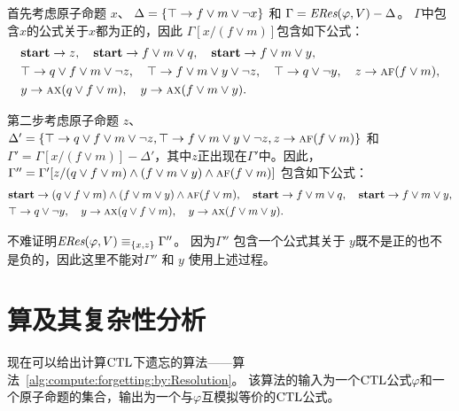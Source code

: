 \begin{example}\label{examp:Aclm}
	首先考虑原子命题 $x$、 $\Delta=\{\top \rightarrow f \vee m \vee \neg x\}$ 和 $\Gamma=\emph{ERes}(\varphi,V)-\Delta$。
	 $\Gamma$中包含$x$的公式关于$x$都为正的，因此 $\Gamma[x/(f \vee m)]$包含如下公式：
	\begin{align*}%
		& \start\rto z, \quad \start \rto f\vee m \vee q, \quad  \start \rto f \vee m \vee y, \\
		& \top \rto q \vee f \vee m \vee \neg z, \quad 	\top \rto f \vee m \vee y \vee \neg z,
		\quad \top \rto q\vee\neg y , \quad z \rto \ALL \FUTURE (f \vee m), \\
		& y \rto \ALL\NEXT(q \vee f\vee m), %
		\quad 	y \rto \ALL\NEXT(f\vee m\vee y).
	\end{align*}
	
	第二步考虑原子命题 $z$、
	$\Delta'=\{ \top \rightarrow q \vee f \vee m \vee \neg z, \top \rightarrow f \vee m \vee y \vee \neg z ,z \rightarrow \textsc{a} \textsc{f} (f \vee m)\}$
	和 $\Gamma'=\Gamma[x/(f \vee m)] -\Delta'$，其中$z$正出现在$\Gamma'$中。因此，
	$\Gamma''=\Gamma'[z/ (q \vee f \vee m)\land (f \vee m \vee y)\land\textsc{a} \textsc{f} (f \vee m)]$ 包含如下公式：
	\begin{align*}%
		& \start\rto  (q \vee f \vee m)\land (f \vee m \vee y)\land\ALL \FUTURE (f \vee m),
		\quad \start \rto f\vee m \vee q, \quad  \start \rto f \vee m \vee y,  \\
		&  \top \rto q\vee\neg y,  \quad y \rto \ALL\NEXT(q \vee f\vee m), \quad y \rto \ALL\NEXT(f\vee m\vee y).
	\end{align*}
	
	不难证明$\emph{ERes}(\varphi,V)\equiv_{\{x,z\}} \Gamma''$。
	因为$\Gamma''$  包含一个公式其关于 $y$既不是正的也不是负的，因此这里不能对$\Gamma''$ 和 $y$ 使用上述过程。 
\end{example}


\section{算及其复杂性分析}
\label{cha4:sec:alg}
现在可以给出计算$\textrm{CTL}$下遗忘的算法——算法~\ref{alg:compute:forgetting:by:Resolution}。
该算法的输入为一个$\textrm{CTL}$公式$\varphi$和一个原子命题的集合，输出为一个与$\varphi$互模拟等价的$\textrm{CTL}$公式。
%


